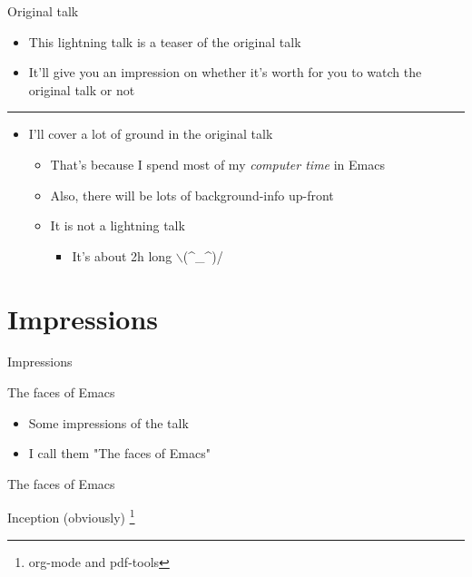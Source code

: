 \documentclass[bigger]{beamer}
\begin{document}
\begin{frame}[label={sec:orga1b1457}]{Original talk}
\begin{itemize}
\item This \alert{lightning talk} is a teaser of the original talk
\item It'll give you an impression on whether it's worth for you to watch
the original talk or not
\end{itemize}

\center\rule{0.5\paperwidth}{0.4pt}

\begin{itemize}
\item I'll cover \alert{a lot} of ground in the original talk
\begin{itemize}
\item That's because I spend most of my \emph{computer time} in Emacs
\item Also, there will be lots of background-info up-front
\item It is \alert{not} a lightning talk
\begin{itemize}
\item It's about 2h long $\backslash$(\^{}\_\^{})/
\end{itemize}
\end{itemize}
\end{itemize}
\end{frame}



\section{Impressions}
\label{sec:org7515602}
\begin{frame}[label={sec:orgac33c62}]{Impressions}
\begin{block}{The faces of Emacs}
\begin{itemize}
\item Some impressions of the talk
\item I call them "The faces of Emacs"
\end{itemize}
\end{block}
\end{frame}


\begin{frame}[label={sec:orgc2dd868}]{The faces of Emacs}
\begin{block}{Inception (obviously)}
 \footnote{org-mode and pdf-tools}
\end{block}
\end{frame}
\end{document}
